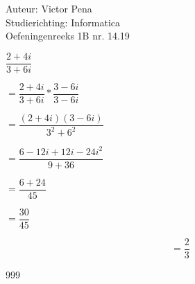 \documentclass[a4paper]{article}
\begin{document}
  
\noindent \large Auteur: Victor Pena \\
\noindent \large Studierichting: Informatica\\
\noindent \large Oefeningenreeks 1B nr. 14.19\\

\medskip

\normalsize

$\dfrac{2+4i}{3+6i}$\\

\medskip

$=\dfrac{2+4i}{3+6i} * \dfrac{3-6i}{3-6i} $

\medskip 

$= \dfrac{(2+4i)(3-6i)}{3^2 + 6 ^ 2}$

\medskip 

$= \dfrac{6 - 12i + 12i -24i^2}{9+36}$

\medskip 

$= \dfrac{6 +24}{45}$

\medskip 

$= \dfrac{30}{45}$

\medskip 

$$=\dfrac{2}{3}$$


\begin{thebibliography}{999}
\end{thebibliography}
\end{document}
